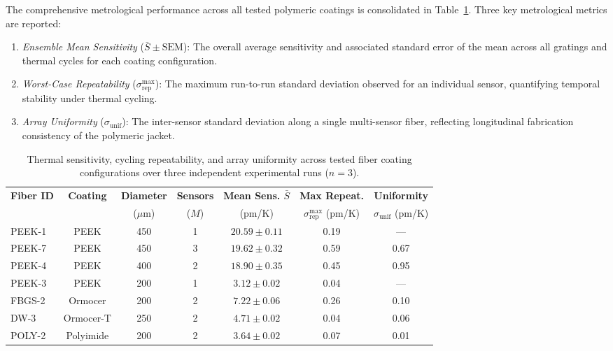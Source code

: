 \documentclass[preprint,11pt]{elsarticle}
\begin{document}
The comprehensive metrological performance across all tested polymeric coatings is consolidated in Table~\ref{tab:repeatability_summary}. Three key metrological metrics are reported:
\begin{enumerate}
    \item \textit{Ensemble Mean Sensitivity} ($\bar{S} \pm \text{SEM}$): The overall average sensitivity and associated standard error of the mean across all gratings and thermal cycles for each coating configuration.
    \item \textit{Worst-Case Repeatability} ($\sigma_{\text{rep}}^{\max}$): The maximum run-to-run standard deviation observed for an individual sensor, quantifying temporal stability under thermal cycling.
    \item \textit{Array Uniformity} ($\sigma_{\text{unif}}$): The inter-sensor standard deviation along a single multi-sensor fiber, reflecting longitudinal fabrication consistency of the polymeric jacket.
\end{enumerate}

\begin{table}[htpb]
    \centering
    \small
    \setlength{\tabcolsep}{4.5pt}
    \caption{Thermal sensitivity, cycling repeatability, and array uniformity across tested fiber coating configurations over three independent experimental runs ($n = 3$).}
    \label{tab:repeatability_summary}
    \begin{tabular}{lcccccc}
        \toprule
        \textbf{Fiber ID} & \textbf{Coating} & \textbf{Diameter} & \textbf{Sensors} & \textbf{Mean Sens. $\bar{S}$} & \textbf{Max Repeat.} & \textbf{Uniformity} \\
        & & ($\mu\text{m}$) & ($M$) & (pm/K) & $\sigma_{\text{rep}}^{\max}$ (pm/K) & $\sigma_{\text{unif}}$ (pm/K) \\
        \midrule
        PEEK-1  & PEEK      & 450 & 1 & $20.59 \pm 0.11$ & 0.19 & --- \\
        PEEK-7  & PEEK      & 450 & 3 & $19.62 \pm 0.32$ & 0.59 & 0.67 \\
        PEEK-4  & PEEK      & 400 & 2 & $18.90 \pm 0.35$ & 0.45 & 0.95 \\
        PEEK-3  & PEEK      & 200 & 1 & $3.12 \pm 0.02$  & 0.04 & --- \\
        FBGS-2  & Ormocer   & 200 & 2 & $7.22 \pm 0.06$  & 0.26 & 0.10 \\
        DW-3    & Ormocer-T & 250 & 2 & $4.71 \pm 0.02$  & 0.04 & 0.06 \\
        POLY-2  & Polyimide & 200 & 2 & $3.64 \pm 0.02$  & 0.07 & 0.01 \\
        \bottomrule
    \end{tabular}
\end{table}
\end{document}
